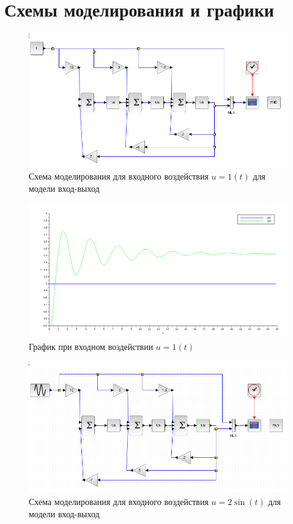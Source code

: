 \documentclass[12pt, a4paper] {ncc}
\begin{document}
	\section{Схемы моделирования и графики}

		\begin{figure}[ht!]
    		\includegraphics[scale=0.5]{./modelio1t.png}
			\caption{Схема моделирования для входного воздействия $u = 1(t)$ для модели вход-выход}
		\end{figure}

		\begin{figure}[ht!]
    		\includegraphics[scale=0.4]{./plotio1t1.png}
			\caption{График при входном воздействии $u = 1(t)$}
		\end{figure}

		\begin{figure}[ht!]
    		\includegraphics[scale=0.5]{./modeliosin.png}
			\caption{Схема моделирования для входного воздействия $u = 2\sin(t)$ для модели вход-выход}
		\end{figure}
\end{document}
